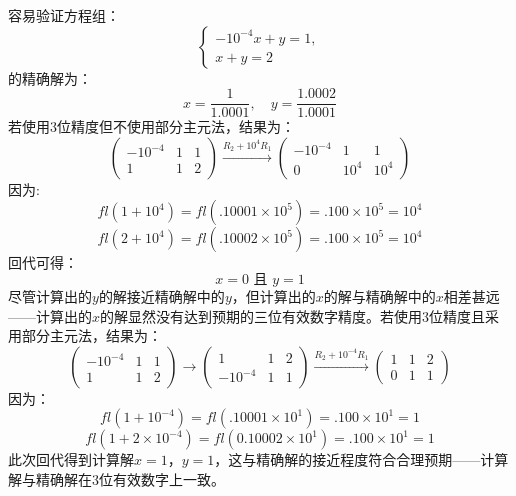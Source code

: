 \begin{example}
\label{example1.5.1}
容易验证方程组：
$$
\begin{cases} 
-10^{-4}x + y = 1, \\
x + y = 2
\end{cases}
$$
的精确解为：
$$
x = \frac{1}{1.0001}, \quad y = \frac{1.0002}{1.0001}
$$
若使用3位精度但不使用部分主元法，结果为：
$$
\left(\begin{array}{cc|c} 
-10^{-4} & 1 & 1 \\
1 & 1 & 2
\end{array}\right) \xrightarrow{R_2 + 10^4 R_1} \left(\begin{array}{cc|c} 
-10^{-4} & 1 & 1 \\
0 & 10^4 & 10^4
\end{array}\right)
$$
因为:
\begin{equation}
fl(1+10^4)=fl(.10001 \times 10^5) = .100 \times 10^5=10^4 \label{equation1.5.1}
\end{equation}
\begin{equation}
fl(2+10^4)=fl(.10002 \times 10^5) = .100 \times 10^5=10^4 \label{equation1.5.2}    
\end{equation}
回代可得：
$$
x = 0 \text{\ 且\ } y = 1
$$
尽管计算出的$y$的解接近精确解中的$y$，但计算出的$x$的解与精确解中的$x$相差甚远——计算出的$x$的解显然没有达到预期的三位有效数字精度。若使用3位精度且采用部分主元法，结果为：
$$
\left(\begin{array}{cc|c} 
-10^{-4} & 1 & 1 \\
1 & 1 & 2
\end{array}\right) \xrightarrow{} \left(\begin{array}{cc|c} 
1 & 1 & 2 \\
-10^{-4} & 1 & 1
\end{array}\right) \xrightarrow{R_2 + 10^{-4} R_1} \left(\begin{array}{cc|c} 
1 & 1 & 2 \\
0 & 1 & 1
\end{array}\right)
$$
因为：
\begin{equation}
fl(1 + 10^{-4}) = fl(.10001 \times 10^1) = .100 \times 10^1 = 1 \label{equation1.5.3}
\end{equation}
\begin{equation}
fl(1 + 2 \times 10^{-4}) = fl(0.10002 \times 10^1) = .100 \times 10^1 = 1 \label{equation1.5.4}
\end{equation}
此次回代得到计算解$x=1$，$y=1$，这与精确解的接近程度符合合理预期——计算解与精确解在3位有效数字上一致。


\end{example}
